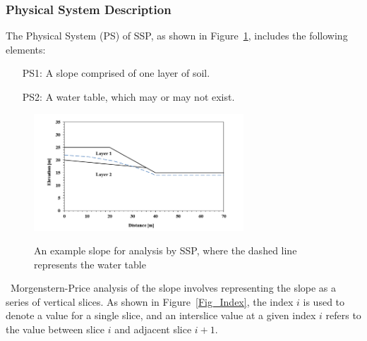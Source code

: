 \documentclass[12pt]{article}
\newcommand{\progname}{SSP}
\begin{document}
\subsubsection{Physical System Description} \label{sec_system}

The Physical System (PS) of \progname{}, as shown in Figure~\ref{Fig_PhysSyst}, 
includes the following elements:

\begin{itemize}
\item[PS1:] A slope comprised of one layer of soil.
\item[PS2:] A water table, which may or may not exist.
\end{itemize}

\begin{figure}[h!]
	\begin{center}
		{
			\includegraphics[width=0.7\textwidth]{PhysSyst.png}
		}
		\caption{An example slope for analysis by \progname{}, where the dashed 
		line represents the water table}
		\label{Fig_PhysSyst}
	\end{center}
\end{figure}

~\newline\noindent Morgenstern-Price \citep{MorgPrice} analysis of the slope 
involves representing the slope as a series of vertical slices. As shown in 
Figure~\ref{Fig_Index}, the index $i$ is used to denote a value for a single 
slice, and an interslice value at a given index $i$ refers to the value between 
slice $i$ and adjacent slice $\textit{i}+1$.
\end{document}
